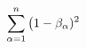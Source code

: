 \documentclass[preview]{standalone}
\begin{document}
\begin{align*}
\special{dvisvgm:raw <g id='unique000'>}\sum_{\alpha=1}^{n}\big(1-\beta_\alpha)^2\special{dvisvgm:raw </g>}
\end{align*}
\end{document}
